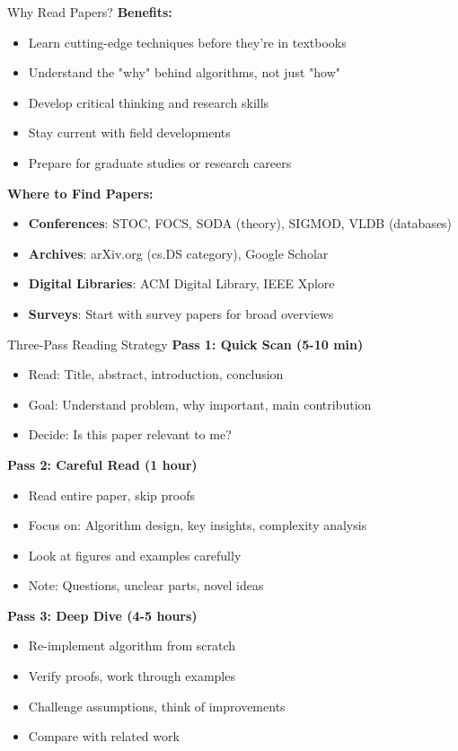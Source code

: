 \documentclass[aspectratio=169,xcolor=dvipsnames]{beamer}
\begin{document}
\begin{frame}{Why Read Papers?}
  \textbf{Benefits:}
  \begin{itemize}
    \item Learn cutting-edge techniques before they're in textbooks
    \item Understand the "why" behind algorithms, not just "how"
    \item Develop critical thinking and research skills
    \item Stay current with field developments
    \item Prepare for graduate studies or research careers
  \end{itemize}

  \vspace{0.3cm}
  \textbf{Where to Find Papers:}
  \begin{itemize}
    \item \textbf{Conferences}: STOC, FOCS, SODA (theory), SIGMOD, VLDB (databases)
    \item \textbf{Archives}: arXiv.org (cs.DS category), Google Scholar
    \item \textbf{Digital Libraries}: ACM Digital Library, IEEE Xplore
    \item \textbf{Surveys}: Start with survey papers for broad overviews
  \end{itemize}
\end{frame}

\begin{frame}{Three-Pass Reading Strategy}
  \textbf{Pass 1: Quick Scan (5-10 min)}
  \begin{itemize}
    \item Read: Title, abstract, introduction, conclusion
    \item Goal: Understand problem, why important, main contribution
    \item Decide: Is this paper relevant to me?
  \end{itemize}

  \vspace{0.3cm}
  \textbf{Pass 2: Careful Read (1 hour)}
  \begin{itemize}
    \item Read entire paper, skip proofs
    \item Focus on: Algorithm design, key insights, complexity analysis
    \item Look at figures and examples carefully
    \item Note: Questions, unclear parts, novel ideas
  \end{itemize}

  \vspace{0.3cm}
  \textbf{Pass 3: Deep Dive (4-5 hours)}
  \begin{itemize}
    \item Re-implement algorithm from scratch
    \item Verify proofs, work through examples
    \item Challenge assumptions, think of improvements
    \item Compare with related work
  \end{itemize}
\end{frame}
\end{document}
